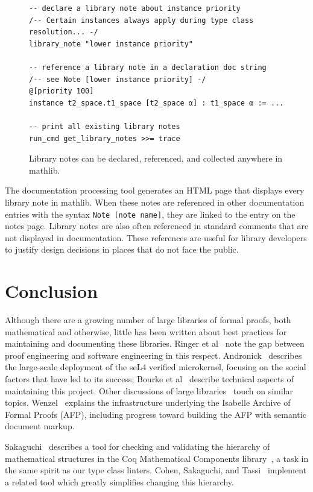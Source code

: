\documentclass[runningheads]{llncs}
\newcommand{\mathlib}{\textsf{mathlib}\xspace}
\newcommand{\lean}[1]{\lstinline[language=lean]{#1}}
\begin{document}
\begin{figure}[t]
\begin{lstlisting}
-- declare a library note about instance priority
/-- Certain instances always apply during type class resolution... -/
library_note "lower instance priority"

-- reference a library note in a declaration doc string
/-- see Note [lower instance priority] -/
@[priority 100]
instance t2_space.t1_space [t2_space α] : t1_space α := ...

-- print all existing library notes
run_cmd get_library_notes >>= trace
\end{lstlisting}

\caption{Library notes can be declared, referenced, and collected anywhere in \mathlib.}
\label{figure:libnote}
\end{figure}

The documentation processing tool
generates an HTML page
that displays every library note in \mathlib.
When these notes are referenced
in other documentation entries
with the syntax \lean{Note [note name]},
they are linked to the entry on the notes page.
Library notes are also often referenced in standard comments
that are not displayed in documentation.
These references are useful for library developers
to justify design decisions in places that do not face the public.


\section{Conclusion}
\label{section:conclusion}

Although there are a growing number of large libraries of formal proofs,
both mathematical and otherwise,
little has been written about
best practices for maintaining and documenting these libraries.
Ringer et al~\cite{Ring19} note the gap between proof engineering and software engineering in this respect.
Andronick~\cite{Andr19} describes the large-scale deployment
of the seL4 verified microkernel,
focusing on the social factors that have led to its success;
Bourke et al~\cite{Bour12} describe technical aspects of maintaining this project.
Other discussions of large libraries~\cite{Banc18, Gont13} touch on similar topics.
Wenzel~\cite{Wenz19} explains the infrastructure
underlying the Isabelle Archive of Formal Proofs (AFP),
including progress toward building the AFP with semantic document markup.

Sakaguchi~\cite{Saka20} describes a tool for
checking and validating the hierarchy of mathematical structures
in the Coq Mathematical Components library~\cite{Mahb17},
a task in the same spirit as our type class linters.
Cohen, Sakaguchi, and Tassi~\cite{Cohe20} implement a related tool
which greatly simplifies changing this hierarchy.
\end{document}
